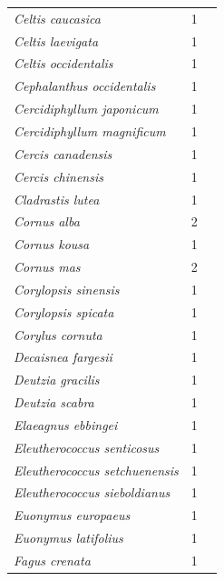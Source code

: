 \documentclass[11pt]{article}
\begin{document}
\begin{longtable}{p{}p{}p{}}
  \emph{Celtis caucasica} &   1 & \emph{\citep{zohner2016}} \\ 
  \emph{Celtis laevigata} &   1 & \emph{\citep{zohner2016}} \\ 
  \emph{Celtis occidentalis} &   1 & \emph{\citep{zohner2016}} \\ 
  \emph{Cephalanthus occidentalis} &   1 & \emph{\citep{zohner2016}} \\ 
  \emph{Cercidiphyllum japonicum} &   1 & \emph{\citep{zohner2016}} \\ 
  \emph{Cercidiphyllum magnificum} &   1 & \emph{\citep{zohner2016}} \\ 
  \emph{Cercis canadensis} &   1 & \emph{\citep{zohner2016}} \\ 
  \emph{Cercis chinensis} &   1 & \emph{\citep{zohner2016}} \\ 
  \emph{Cladrastis lutea} &   1 & \emph{\citep{zohner2016}} \\ 
  \emph{Cornus alba} &   2 & \emph{\citep{Laube:2014a,zohner2016}} \\ 
  \emph{Cornus kousa} &   1 & \emph{\citep{zohner2016}} \\ 
  \emph{Cornus mas} &   2 & \emph{\citep{Laube:2014a,Laube:2014b}} \\ 
  \emph{Corylopsis sinensis} &   1 & \emph{\citep{zohner2016}} \\ 
  \emph{Corylopsis spicata} &   1 & \emph{\citep{zohner2016}} \\ 
  \emph{Corylus cornuta} &   1 & \emph{\citep{flynn2018}} \\ 
  \emph{Decaisnea fargesii} &   1 & \emph{\citep{zohner2016}} \\ 
  \emph{Deutzia gracilis} &   1 & \emph{\citep{zohner2016}} \\ 
  \emph{Deutzia scabra} &   1 & \emph{\citep{zohner2016}} \\ 
  \emph{Elaeagnus ebbingei} &   1 & \emph{\citep{zohner2016}} \\ 
  \emph{Eleutherococcus senticosus} &   1 & \emph{\citep{zohner2016}} \\ 
  \emph{Eleutherococcus setchuenensis} &   1 & \emph{\citep{zohner2016}} \\ 
  \emph{Eleutherococcus sieboldianus} &   1 & \emph{\citep{zohner2016}} \\ 
  \emph{Euonymus europaeus} &   1 & \emph{\citep{zohner2016}} \\ 
  \emph{Euonymus latifolius} &   1 & \emph{\citep{zohner2016}} \\ 
  \emph{Fagus crenata} &   1 & \emph{\citep{zohner2016}} \\ 

\end{longtable}
\end{document}

